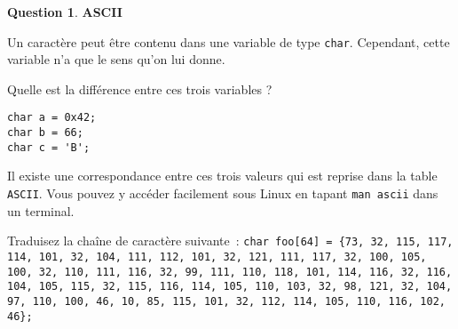 \documentclass[11pt,a4paper,dvipsnames]{article}
\theoremstyle{definition}%
\newtheorem{Q}{Question}[] %
\begin{document}
\begin{Q} \textbf{ASCII}

Un caractère peut être contenu dans une variable de type \texttt{char}.
Cependant, cette variable n'a que le sens qu'on lui donne.

Quelle est la différence entre ces trois variables ?

\begin{verbatim}
char a = 0x42;
char b = 66;
char c = 'B';
\end{verbatim}

Il existe une correspondance entre ces trois valeurs qui est reprise dans la table \texttt{ASCII}.
Vous pouvez y accéder facilement sous Linux en tapant \texttt{man ascii} dans un terminal.

Traduisez la chaîne de caractère suivante~: \texttt{char foo[64] = \{73, 32, 115, 117, 114, 101, 32, 104, 111, 112, 101, 32, 121, 111, 117, 32, 100, 105, 100, 32, 110, 111, 116, 32, 99, 111, 110, 118, 101, 114, 116, 32, 116, 104, 105, 115, 32, 115, 116, 114, 105, 110, 103, 32, 98, 121, 32, 104, 97, 110, 100, 46, 10, 85, 115, 101, 32, 112, 114, 105, 110, 116, 102, 46\};}

\end{Q}
\end{document}
